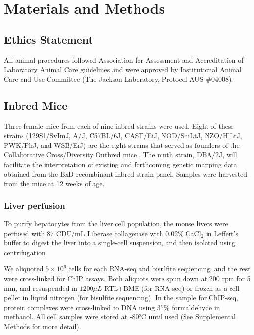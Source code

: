 \documentclass[
  11pt,
]{article}
\begin{document}
\hypertarget{materials-and-methods}{%
\section{Materials and Methods}\label{materials-and-methods}}

\hypertarget{ethics-statement}{%
\subsection{Ethics Statement}\label{ethics-statement}}

All animal procedures followed Association for Assessment and
Accreditation of Laboratory Animal Care guidelines and were approved by
Institutional Animal Care and Use Committee (The Jackson Laboratory,
Protocol AUS \#04008).

\hypertarget{inbred-mice}{%
\subsection{Inbred Mice}\label{inbred-mice}}

Three female mice from each of nine inbred strains were used. Eight of
these strains (129S1/SvImJ, A/J, C57BL/6J, CAST/EiJ, NOD/ShiLtJ,
NZO/HlLtJ, PWK/PhJ, and WSB/EiJ) are the eight strains that served as
founders of the Collaborative Cross/Diversity Outbred mice
\citep{Chesler:2008ge}. The ninth strain, DBA/2J, will facilitate the
interpretation of existing and forthcoming genetic mapping data obtained
from the BxD recombinant inbred strain panel. Samples were harvested
from the mice at 12 weeks of age.

\hypertarget{liver-perfusion}{%
\subsubsection{Liver perfusion}\label{liver-perfusion}}

To purify hepatocytes from the liver cell population, the mouse livers
were perfused with 87 CDU/mL Liberase collagenase with 0.02\% CaCl\(_2\)
in Leffert's buffer to digest the liver into a single-cell suspension,
and then isolated using centrifugation.

We aliquoted \(5 \times 10^{6}\) cells for each RNA-seq and bisulfite
sequencing, and the rest were cross-linked for ChIP assays. Both
aliquots were spun down at 200 rpm for 5 min, and resuspended in
\(1200\mu L\) RTL+BME (for RNA-seq) or frozen as a cell pellet in liquid
nitrogen (for bisulfite sequencing). In the sample for ChIP-seq, protein
complexes were cross-linked to DNA using 37\% formaldehyde in methanol.
All cell samples were stored at -80°C until used (See Supplemental
Methods for more detail).
\end{document}
